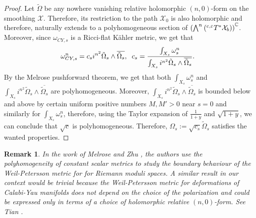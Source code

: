 \documentclass[a4paper,11pt]{article}
\newcounter{mythm}[section]
\newtheorem{rem}[mythm]{Remark}
\def\C{\mathbb{C}}
\begin{document}
\begin{proof}
    Let $\tilde \Omega$ be any nowhere vanishing relative holomorphic $(n,0)$-form on the smoothing $\mathcal{X}$. Therefore, its restriction to the path $\mathcal{X}_0$ is also holomorphic and therefore, naturally extends to a polyhomogeneous section of $\left(\bigwedge^{n} \hspace{0.07cm} (^{c, \varepsilon} \hspace{0.01cm} T^{*} \mathcal{X}_b) \right)^{\C}$. Moreover, since $\omega_{CY,s}$ is a Ricci-flat Kähler metric, we get that 
    $$
    \omega_{CY,s}^n = c_s i^{n^2} \tilde \Omega_s \wedge \overline{\tilde \Omega_s}, \hspace{0.1cm} \hspace{0.1cm} c_s = \frac{\int_{X_s} \omega_s^n}{\int_{X_s} i^{n^2} \tilde \Omega_s \wedge \overline{\tilde \Omega_s}}. 
    $$
    By the Melrose pushforward theorem, we get that both $\int_{X_s} \omega_s^n$ and $\int_{X_s} i^{n^2} \tilde \Omega_s \wedge \overline{\tilde \Omega_s}$ are polyhomogeneous. Moreover, $ \int_{X_s} i^{n^2} \tilde \Omega_s \wedge \overline{\tilde \Omega_s}$ is bounded below and above by certain uniform positive numbers $M, M'>0$ near $s=0$ and similarly for $\int_{X_s} \omega_s^n$, therefore, using the Taylor expansion of $\frac{1}{1+ y}$ and $\sqrt{1 + y}$, we can conclude that $\sqrt{c}$ is polyhomogeneous. Therefore, $\Omega_s := \sqrt{c_s} \tilde \Omega_s$ satisfies the wanted properties.  
 
\end{proof}
\begin{rem}
    In the work of Melrose and Zhu \cite{melrose_resolution_2018, MR4001023}, the authors use the polyhomogeneity of constant scalar metrics to study the boundary behaviour of the Weil-Petersson metric for for Riemann moduli spaces. A similar result in our context would be trivial because the Weil-Petersson metric for deformations of Calabi-Yau manifolds does not depend on the choice of the polarization and could be expressed only in terms of a choice of holomorphic relative $(n,0)$-form. See Tian \cite[Theorem 2]{MR915841}.
\end{rem}
\end{document}
